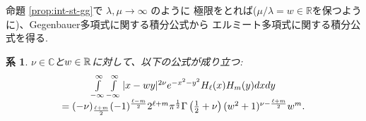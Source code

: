 \documentclass[pdf,notes]{beamer}
\newtheorem{cor}{系}
\begin{document}
\begin{frame}
	命題 \ref{prop:int-st-gg}で $\lambda,\mu\to\infty$ のように
	極限をとれば($\mu/\lambda=w\in\mathbb{R}$を保つように)、Gegenbauer多項式に関する積分公式から
	エルミート多項式に関する積分公式を得る.
	\begin{cor}\label{cor:int-xzy-hh}
		$\nu\in\mathbb{C}$と$w\in\mathbb{R}$に対して、以下の公式が成り立つ:
		\begin{equation*}
			\begin{array}[]{c}
			\int_{- \infty}^{\infty} \int_{- \infty}^{\infty} | x - w y |^{2 \nu} e^{-
			x^2 - y^2} H_\ell (x) H_m (y) d x d y \\= (- \nu)_{\frac{\ell + m}{2}} (- 1)^{\frac{\ell
			- m}{2}} 2^{\ell + m} \pi^{\frac{1}{2}} \Gamma \left( \frac{1}{2} + \nu \right)
			(w^2 + 1)^{\nu - \frac{\ell + m}{2}} w^m .
			\end{array}
		\end{equation*}
	\end{cor}
\end{frame}
\end{document}
